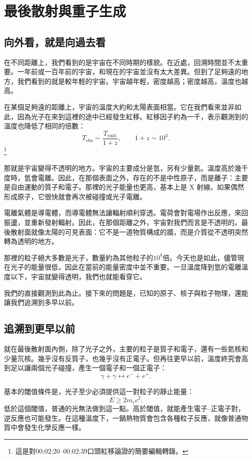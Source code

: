 \chapter{最後散射與重子生成}

\section{向外看，就是向過去看}

在不同距離上，我們看到的是宇宙在不同時期的樣貌。在近處，回溯時間並不太重要。一年前或一百年前的宇宙，和現在的宇宙並沒有太大差異。但到了足夠遠的地方，我們看到的就是較年輕的宇宙。宇宙越年輕，密度越高；密度越高，溫度也越高。

在某個足夠遠的距離上，宇宙的溫度大約和太陽表面相當。它在我們看來並非如此，因為光子在來到這裡的途中已經發生紅移。紅移因子約為一千，表示觀測到的溫度也降低了相同的倍數：
\[
T_{\mathrm{obs}} \sim \frac{T_{\mathrm{emit}}}{1+z},
\qquad
1+z \sim 10^3.
\]\footnote{這是對00:02:20--00:02:39口頭紅移論證的簡要編輯轉錄。}

那就是宇宙變得不透明的地方。宇宙的主要成分是氫，另有少量氦。溫度高於幾千度時，氫會電離。因此，在那個表面之外，存在的不是中性原子，而是離子：主要是自由運動的質子和電子。那裡的光子能量也更高，基本上是 X 射線。如果偶然形成原子，它很快就會再次被碰撞或光子電離。

電離氣體是導電體，而導電體無法讓輻射順利穿透。電荷會對電場作出反應，來回振盪，並重新發射輻射。因此，在那個距離之外，宇宙對我們而言是不透明的。最後散射面就像太陽的可見表面：它不是一道物質構成的牆，而是介質從不透明突然轉為透明的地方。

那裡的粒子絕大多數是光子，數量約為其他粒子的\(10^8\)倍。今天也是如此，儘管現在光子的能量很低，因此在當前的能量密度中並不重要。一旦溫度降到氫的電離溫度以下，宇宙就變得透明，我們也就能看穿它。

我們的直接觀測到此為止。接下來的問題是，已知的原子、核子與粒子物理，還能讓我們追溯到多早以前。

\section{追溯到更早以前}

就在最後散射面內側，除了光子之外，主要的粒子是質子和電子，還有一些氦核和少量氘核。幾乎沒有反質子，也幾乎沒有正電子。但再往更早以前，溫度終究會高到足以讓兩個光子碰撞，產生一個電子和一個正電子：
\[
\gamma + \gamma \leftrightarrow e^- + e^+.
\]

基本的閾值條件是，光子至少必須提供這一對粒子的靜止能量：
\[
E \ge 2m_e c^2.
\]
低於這個閾值，普通的光無法做到這一點。高於閾值，就能產生電子--正電子對，逆反應也可能發生。在這種溫度下，一鍋熱物質會包含各種粒子反應，就像普通物質中會發生化學反應一樣。

